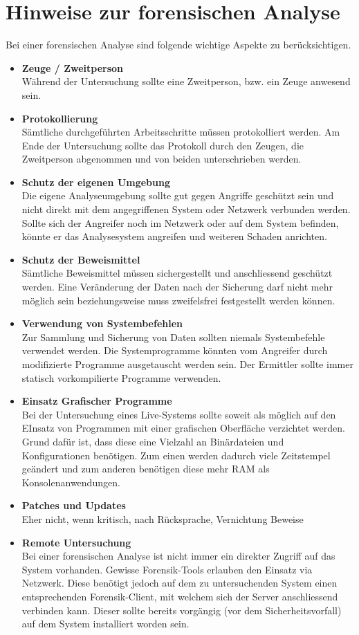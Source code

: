 \section{Hinweise zur forensischen Analyse}
Bei einer forensischen Analyse sind folgende wichtige Aspekte zu berücksichtigen.

\begin{itemize}
\item \textbf{Zeuge / Zweitperson} \\
Während der Untersuchung sollte eine Zweitperson, bzw. ein Zeuge anwesend sein.
\item \textbf{Protokollierung} \\
Sämtliche durchgeführten Arbeitsschritte müssen protokolliert werden. Am Ende der Untersuchung sollte das Protokoll durch den Zeugen, die Zweitperson abgenommen und von beiden unterschrieben werden.
\item \textbf{Schutz der eigenen Umgebung} \\
Die eigene Analyseumgebung sollte gut gegen Angriffe geschützt sein und nicht direkt mit dem angegriffenen System oder Netzwerk verbunden werden. Sollte sich der Angreifer noch im Netzwerk oder auf dem System befinden, könnte er das Analysesystem angreifen und weiteren Schaden anrichten.
\item \textbf{Schutz der Beweismittel} \\
Sämtliche Beweismittel müssen sichergestellt und anschliessend geschützt werden. Eine Veränderung der Daten nach der Sicherung darf nicht mehr möglich sein beziehungsweise muss zweifelsfrei festgestellt werden können.
\item \textbf{Verwendung von Systembefehlen} \\
Zur Sammlung und Sicherung von Daten sollten niemals Systembefehle verwendet werden. Die Systemprogramme könnten vom Angreifer durch modifizierte Programme ausgetauscht werden sein. Der Ermittler sollte immer statisch vorkompilierte Programme verwenden.
\item \textbf{Einsatz Grafischer Programme} \\
Bei der Untersuchung eines Live-Systems sollte soweit als möglich auf den EInsatz von Programmen mit einer grafischen Oberfläche verzichtet werden. Grund dafür ist, dass diese eine Vielzahl an Binärdateien und Konfigurationen benötigen. Zum einen werden dadurch viele Zeitstempel geändert und zum anderen benötigen diese mehr RAM als Konsolenanwendungen.
\item \textbf{Patches und Updates} \\
Eher nicht, wenn kritisch, nach Rücksprache, Vernichtung Beweise
\item \textbf{Remote Untersuchung} \\
Bei einer forensischen Analyse ist nicht immer ein direkter Zugriff auf das System vorhanden. Gewisse Forensik-Tools erlauben den Einsatz via Netzwerk. Diese benötigt jedoch auf dem zu untersuchenden System einen entsprechenden Forensik-Client, mit welchem sich der Server anschliessend verbinden kann. Dieser sollte bereits vorgängig (vor dem Sicherheitsvorfall) auf dem System installiert worden sein.
\end{itemize}
